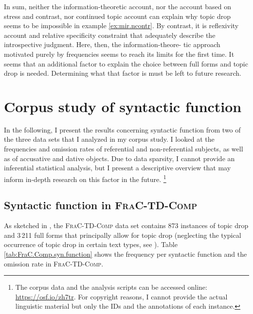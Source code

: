 In sum, neither the information-theoretic account, nor the account based on stress and contrast, nor   continued topic account can explain why topic drop seems to be impossible in example \ref{ex:mir.ncontr}.
By contrast, it is  reflexivity  account and  relative specificity constraint that adequately describe the introspective judgment.
Here, then, the information-theore- tic approach motivated purely by frequencies seems to reach its limits for the first time.
It seems that an additional factor to explain the choice between full forms and topic drop is needed.
Determining what that factor is must be left to future research.

\section{Corpus study of syntactic function}\label{sec:corpus.function}
In the following, I present the results concerning syntactic function from two of the three data sets that I analyzed in my corpus study.
I looked at the frequencies and omission rates of referential and non-referential subjects, as well as of accusative  and dative  objects.
Due to data sparsity, I cannot provide an inferential statistical analysis, but I present a descriptive overview that may inform in-depth research on this factor in the future.%
\footnote{The corpus data and the analysis scripts can be accessed online: \url{https://osf.io/zh7tr}.
For copyright reasons, I cannot provide the actual linguistic material but only the IDs and the annotations of each instance.}
%

\subsection{Syntactic function in \textsc{FraC-TD-Comp}}\label{sec:frac.td.comp.function}
As sketched in , the \textsc{FraC-TD-Comp} data set contains 873 instances of topic drop and 3\,211 full forms that principally allow for topic drop (neglecting the typical occurrence of topic drop in certain text types, see ).
Table \ref{tab:FraC.Comp.syn.function} shows the frequency per syntactic function and the omission rate in \textsc{FraC-TD-Comp}.

